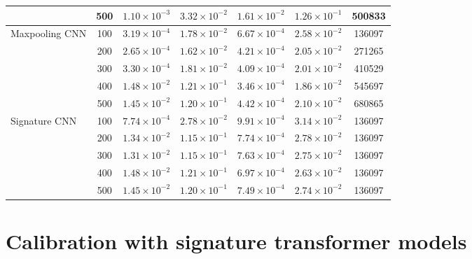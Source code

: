 \documentclass[]{article}
\renewcommand{\(}{\left(}
\renewcommand{\)}{\right)}
\begin{document}
\begin{table}[H]
{\begin{tabular}{l c c c c c c}
				&500&$1.10\times10^{-3}$&$3.32\times10^{-2}$&$1.61\times10^{-2}$&$1.26\times10^{-1}$&500833\\
				\hline
				\multirow{5}{*}{Maxpooling CNN}&100&$3.19\times10^{-4}$&$1.78\times10^{-2}$&$6.67\times10^{-4}$&$2.58\times10^{-2}$&136097\\
				&200&$2.65\times10^{-4}$&$1.62\times10^{-2}$&$4.21\times10^{-4}$&$2.05\times10^{-2}$&271265\\
				&300&$3.30\times10^{-4}$&$1.81\times10^{-2}$&$4.09\times10^{-4}$&$2.01\times10^{-2}$&410529\\
				&400&$1.48\times10^{-2}$&$1.21\times10^{-1}$&$3.46\times10^{-4}$&$1.86\times10^{-2}$&545697\\
				&500&$1.45\times10^{-2}$&$1.20\times10^{-1}$&$4.42\times10^{-4}$&$2.10\times10^{-2}$&680865\\
				\hline
				\multirow{5}{*}{Signature CNN}&100&$7.74\times10^{-4}$&$2.78\times10^{-2}$&$9.91\times10^{-4}$&$3.14\times10^{-2}$&136097\\
				&200&$1.34\times10^{-2}$&$1.15\times10^{-1}$&$7.74\times10^{-4}$&$2.78\times10^{-2}$&136097\\
				&300&$1.31\times10^{-2}$&$1.15\times10^{-1}$&$7.63\times10^{-4}$&$2.75\times10^{-2}$&136097\\
				&400&$1.48\times10^{-2}$&$1.21\times10^{-1}$&$6.97\times10^{-4}$&$2.63\times10^{-2}$&136097\\
				&500&$1.45\times10^{-2}$&$1.20\times10^{-1}$&$7.49\times10^{-4}$&$2.74\times10^{-2}$&136097\\
				\bottomrule
		\end{tabular}}
	\end{table}
	
	\section{Calibration with signature transformer models}\label{sec2}
\end{document}
